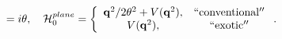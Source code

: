 \begin{equation}
[q_1,q_2]=i\theta,\quad {\cal H}^{plane}_0=\left\{
\begin{array}{cc}
{{\bf q}^2}/{2\theta^2}+{ V}({\bf q}^2),&{\rm ``conventional''}\cr
   { V}({\bf q}^2),&{\rm ``exotic''}
\end{array}\right. .
 \label{E0}\end{equation}

